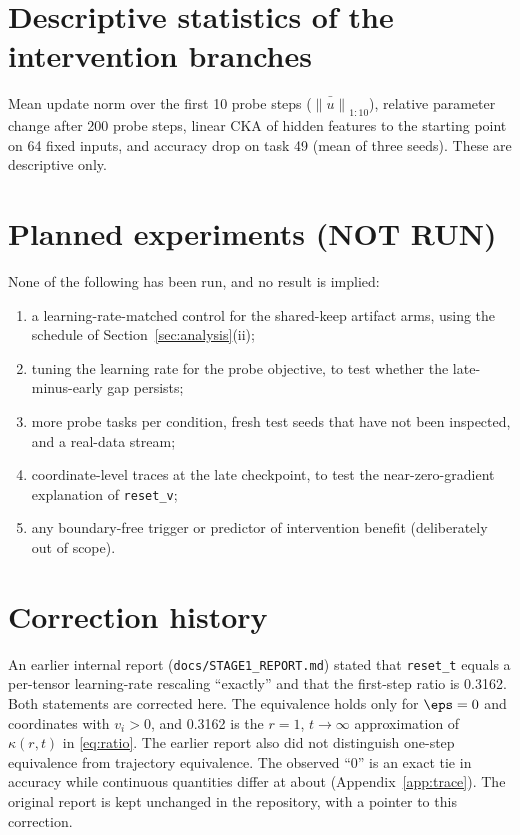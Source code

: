 \section{Descriptive statistics of the intervention branches}
\label{app:descriptive}
Mean update norm over the first 10 probe steps ($\bar{\|u\|}_{1:10}$), relative parameter change after
200 probe steps, linear CKA of hidden features to the starting point on 64 fixed inputs, and accuracy
drop on task 49 (mean of three seeds). These are descriptive only.
\begin{center}\scriptsize\setlength{\tabcolsep}{3pt}

\end{center}

\section{Planned experiments (NOT RUN)}
\label{app:planned}
None of the following has been run, and no result is implied:
\begin{enumerate}
\item a learning-rate-matched control for the shared-keep artifact arms, using the schedule of
Section~\ref{sec:analysis}(ii);
\item tuning the learning rate for the probe objective, to test whether the late-minus-early gap
persists;
\item more probe tasks per condition, fresh test seeds that have not been inspected, and a real-data
stream;
\item coordinate-level traces at the late checkpoint, to test the near-zero-gradient explanation of
\texttt{reset\_v};
\item any boundary-free trigger or predictor of intervention benefit (deliberately out of scope).
\end{enumerate}

\section{Correction history}
\label{app:corrections}
An earlier internal report (\texttt{docs/STAGE1\_REPORT.md}) stated that \texttt{reset\_t} equals a
per-tensor learning-rate rescaling ``exactly'' and that the first-step ratio is 0.3162. Both statements
are corrected here. The equivalence holds only for $\eps=0$ and coordinates with $v_i>0$, and 0.3162 is
the $r=1$, $t\to\infty$ approximation of $\kappa(r,t)$ in \eqref{eq:ratio}. The earlier report also
did not distinguish one-step equivalence from trajectory equivalence. The observed ``0'' is an exact tie
in accuracy while continuous quantities differ at about \TrajLossDiff{} (Appendix~\ref{app:trace}). The
original report is kept unchanged in the repository, with a pointer to this correction.
